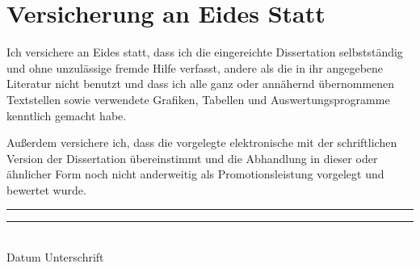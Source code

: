 \documentclass{dissertation}
\begin{document}
% 


% 
% 



% 

\begin{fullwidth}
\printbibliography{}
\end{fullwidth}

\cleardoublepage{}

\chapter*{Versicherung an Eides Statt}

Ich versichere an Eides statt, dass ich die eingereichte Dissertation selbstständig und ohne unzulässige fremde Hilfe verfasst, andere als die in ihr angegebene Literatur nicht benutzt und dass ich alle ganz oder annähernd übernommenen Textstellen sowie verwendete Grafiken, Tabellen und Auswertungsprogramme kenntlich gemacht habe.

Außerdem versichere ich, dass die vorgelegte elektronische mit der schriftlichen Version der Dissertation übereinstimmt und die Abhandlung in dieser oder ähnlicher Form noch nicht anderweitig als Promotionsleistung vorgelegt und bewertet wurde.

\vspace{1cm}
\noindent
\rule{45mm}{0.1pt} \hfill{} \rule{45mm}{0.1pt}\\
Datum \hfill{} Unterschrift

\cleardoublepage{}
\end{document}
